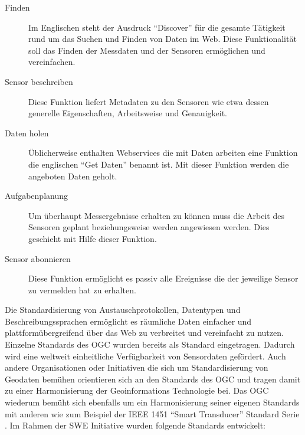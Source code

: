 \begin{description}
\item[Finden] Im Englischen steht der Ausdruck ``Discover'' für die gesamte Tätigkeit rund um das Suchen und Finden von Daten im Web. Diese Funktionalität soll das Finden der Messdaten und der Sensoren ermöglichen und vereinfachen.
\item[Sensor beschreiben] Diese Funktion liefert Metadaten zu den Sensoren wie etwa dessen generelle Eigenschaften, Arbeitsweise und Genauigkeit.
\item[Daten holen] Üblicherweise enthalten Webservices die mit Daten arbeiten eine Funktion die englischen ``Get Daten'' benannt ist. Mit dieser Funktion werden die angeboten Daten geholt.
\item[Aufgabenplanung] Um überhaupt Messergebnisse erhalten zu können muss die Arbeit des Sensoren geplant beziehungsweise werden angewiesen werden. Dies geschieht mit Hilfe dieser Funktion.
\item[Sensor abonnieren] Diese Funktion ermöglicht es passiv alle Ereignisse die der jeweilige Sensor zu vermelden hat zu erhalten.
\end{description}

\citep{botts_ogc_2008}\citep{broring_new_2011}

Die Standardisierung von Austauschprotokollen, Datentypen und Beschreibungssprachen ermöglicht es räumliche Daten einfacher und plattformübergreifend über das Web zu verbreitet und vereinfacht zu nutzen. Einzelne Standards des \gls{OGC} wurden bereits als  Standard eingetragen. Dadurch wird eine weltweit einheitliche Verfügbarkeit von Sensordaten gefördert. Auch andere Organisationen oder Initiativen die sich um Standardisierung von Geodaten bemühen orientieren sich an den Standards des \gls{OGC} und tragen damit zu einer Harmonisierung der Geoinformations Technologie bei. Das \gls{OGC} wiederum bemüht sich ebenfalls um ein Harmonisierung seiner eigenen Standards mit anderen wie zum Beispiel der IEEE 1451 ``Smart Transducer'' Standard Serie \citep{botts_ogc_2008}. Im Rahmen der \gls{SWE} Initiative wurden folgende Standards entwickelt:

